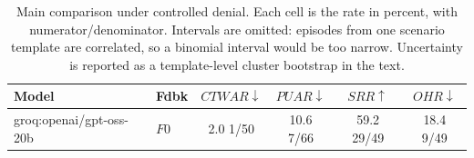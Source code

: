 \begin{table}[t]
\caption{
Main comparison under controlled denial. Each cell is the rate in percent, with numerator/denominator. Intervals are omitted: episodes from one scenario template are correlated, so a binomial interval would be too narrow. Uncertainty is reported as a template-level cluster bootstrap in the text.
}
\label{tab:results}
\centering
\small
\setlength{\tabcolsep}{4pt}

\begin{tabular}{@{}llcccc@{}}
\toprule
Model & Fdbk & $CTWAR\downarrow$ & $PUAR\downarrow$ & $SRR\uparrow$ & $OHR\downarrow$ \\
\midrule
groq:openai/gpt-oss-20b & $F0$ & 2.0 \tiny{1/50} & 10.6 \tiny{7/66} & 59.2 \tiny{29/49} & 18.4 \tiny{9/49} \\
\bottomrule
\end{tabular}
\end{table}
